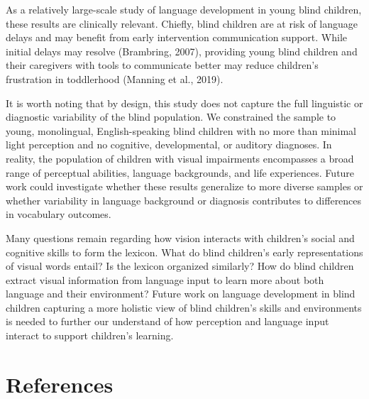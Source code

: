 \documentclass[
  man,floatsintext]{apa6}
\begin{document}
As a relatively large-scale study of language development in young blind children, these results are clinically relevant. Chiefly, blind children are at risk of language delays and may benefit from early intervention communication support. While initial delays may resolve (Brambring, 2007), providing young blind children and their caregivers with tools to communicate better may reduce children's frustration in toddlerhood (Manning et al., 2019).

It is worth noting that by design, this study does not capture the full linguistic or diagnostic variability of the blind population. We constrained the sample to young, monolingual, English-speaking blind children with no more than minimal light perception and no cognitive, developmental, or auditory diagnoses. In reality, the population of children with visual impairments encompasses a broad range of perceptual abilities, language backgrounds, and life experiences. Future work could investigate whether these results generalize to more diverse samples or whether variability in language background or diagnosis contributes to differences in vocabulary outcomes.

Many questions remain regarding how vision interacts with children's social and cognitive skills to form the lexicon. What do blind children's early representations of visual words entail? Is the lexicon organized similarly? How do blind children extract visual information from language input to learn more about both language and their environment? Future work on language development in blind children capturing a more holistic view of blind children's skills and environments is needed to further our understand of how perception and language input interact to support children's learning.

\hypertarget{references}{%
\section*{References}\label{references}}
\end{document}
